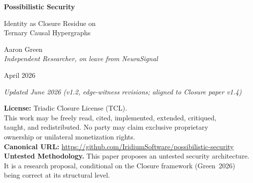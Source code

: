\documentclass[11pt,a4paper]{article}
\theoremstyle{definition}
\theoremstyle{remark}
\begin{document}

\begin{titlepage}
\centering
\vspace*{3cm}
{\Huge\bfseries Possibilistic Security\par}
\vspace{0.8cm}
{\LARGE Identity as Closure Residue on\\Ternary Causal Hypergraphs\par}
\vspace{2cm}
{\Large Aaron Green\\[0.3em]\normalsize\textit{Independent Researcher, on leave from NeuraSignal}\par}
\vspace{0.5cm}
{\large April 2026\par}
\vspace{0.3em}
{\normalsize\textit{Updated June 2026 (v1.2, edge-witness revisions; aligned to Closure paper v1.4)}\par}
\vspace{3cm}
{\small
\textbf{License:} Triadic Closure License (TCL).\\
This work may be freely read, cited, implemented, extended, critiqued,\\
taught, and redistributed. No party may claim exclusive proprietary\\
ownership or unilateral monetization rights.\\[1em]
\textbf{Canonical URL:} \url{https://github.com/IridiumSoftware/possibilistic-security}\\[1em]
\textbf{Untested Methodology.} This paper proposes an untested security architecture.\\
It is a research proposal, conditional on the Closure framework (Green~2026)\\
being correct at its structural level.
}
\vfill
\end{titlepage}
\end{document}
